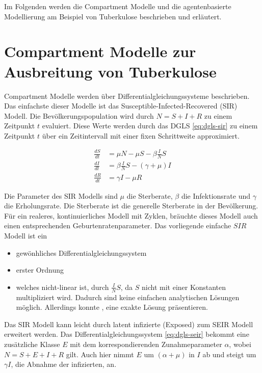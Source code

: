 \documentclass[paper=a4, fontsize=11pt, ngerman, abstract=on]{scrartcl}
\numberwithin{equation}{section} %
\numberwithin{figure}{section} %
\numberwithin{table}{section} %
\begin{document}
Im Folgenden werden die Compartment Modelle und die agentenbasierte Modellierung am Beispiel von Tuberkulose beschrieben und erläutert.


\section{Compartment Modelle zur Ausbreitung von Tuberkulose}

Compartment Modelle werden über Differentialgleichungssysteme beschrieben. Das einfachste dieser Modelle ist das Susceptible-Infected-Recovered (SIR) Modell. Die Bevölkerungspopulation wird durch $N = S + I + R$ zu einem Zeitpunkt $t$ evaluiert. Diese Werte werden durch das DGLS \ref{eq:dgls-sir} zu einem Zeitpunkt $t$ über ein Zeitintervall mit einer fixen Schrittweite approximiert.

\begin{equation}
\begin{split}
  \frac{dS}{dt} &= \mu N - \mu S - \beta \frac{I}{N}S \\
  \frac{dI}{dt} &= \beta \frac{I}{N}S  - (\gamma + \mu)I \\
  \frac{dR}{dt} &= \gamma I - \mu R
\end{split}
\label{eq:dgls-sir}
\end{equation}

Die Parameter des SIR Modells sind $\mu$ die Sterberate, $\beta$ die Infektionsrate und $\gamma$ die Erholungsrate. Die Sterberate ist die generelle Sterberate in der Bevölkerung. Für ein realeres, kontinuierliches Modell mit Zyklen, bräuchte dieses Modell auch einen entsprechenden Geburtenratenparameter. Das vorliegende einfache $SIR$ Modell ist ein

\begin{itemize}
  \item{gewönhliches Differentialgleichungssystem}
  \item{erster Ordnung}
  \item{welches nicht-linear ist, durch $\frac{I}{N}S$, da $S$ nicht mit einer Konstanten multipliziert wird. Dadurch sind keine einfachen analytischen Lösungen möglich. Allerdings konnte \cite{Harko2014}, eine exakte Lösung präsentieren.}
\end{itemize}

 Das SIR Modell kann leicht durch latent infizierte (Exposed) zum SEIR Modell erweitert werden. Das Differentialgleichungssystem \ref{eq:dgls-seir} bekommt eine zusätzliche Klasse $E$ mit dem korrespondierenden Zunahmeparameter $\alpha$, wobei $N = S + E + I + R$ gilt. Auch hier nimmt $E$ um $(\alpha + \mu)$ in $I$ ab und steigt um $\gamma I$, die Abnahme der infizierten, an.
\end{document}
